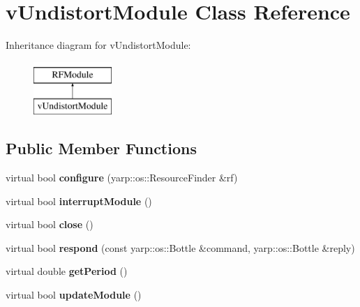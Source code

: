 \hypertarget{classvUndistortModule}{}\section{v\+Undistort\+Module Class Reference}
\label{classvUndistortModule}
Inheritance diagram for v\+Undistort\+Module\+:\begin{figure}[H]
\begin{center}
\leavevmode
\includegraphics[height=2.000000cm]{classvUndistortModule}
\end{center}
\end{figure}
\subsection*{Public Member Functions}
\begin{DoxyCompactItemize}
\item 
virtual bool {\bfseries configure} (yarp\+::os\+::\+Resource\+Finder \&rf)\hypertarget{classvUndistortModule_a9f4fce79ccdc9e9b3b2269c4d94beb22}{}\label{classvUndistortModule_a9f4fce79ccdc9e9b3b2269c4d94beb22}

\item 
virtual bool {\bfseries interrupt\+Module} ()\hypertarget{classvUndistortModule_ab552bfdeddb57cb1cb332169761571d8}{}\label{classvUndistortModule_ab552bfdeddb57cb1cb332169761571d8}

\item 
virtual bool {\bfseries close} ()\hypertarget{classvUndistortModule_a03d2de14720d332b0bbafe5b200f3ce0}{}\label{classvUndistortModule_a03d2de14720d332b0bbafe5b200f3ce0}

\item 
virtual bool {\bfseries respond} (const yarp\+::os\+::\+Bottle \&command, yarp\+::os\+::\+Bottle \&reply)\hypertarget{classvUndistortModule_a11c58860f7bcd6783d8265b55b8a4fe9}{}\label{classvUndistortModule_a11c58860f7bcd6783d8265b55b8a4fe9}

\item 
virtual double {\bfseries get\+Period} ()\hypertarget{classvUndistortModule_a8ec64be6e169a66a5c68aedb3f8618f0}{}\label{classvUndistortModule_a8ec64be6e169a66a5c68aedb3f8618f0}

\item 
virtual bool {\bfseries update\+Module} ()\hypertarget{classvUndistortModule_a68a6946ee4bb8197ec555cf3d2f3b657}{}\label{classvUndistortModule_a68a6946ee4bb8197ec555cf3d2f3b657}

\end{DoxyCompactItemize}


